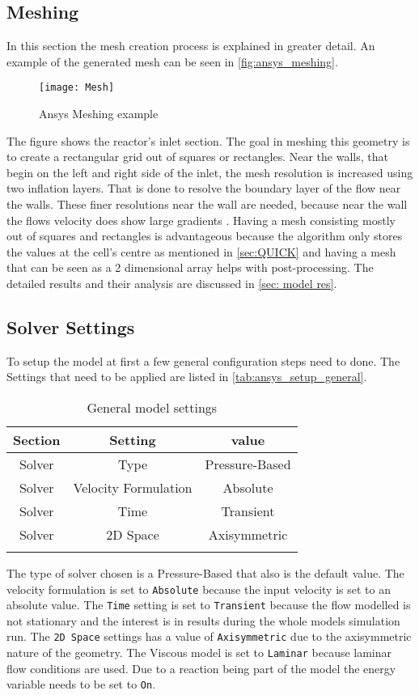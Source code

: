 \documentclass[../thesis.tex]{subfiles}
\begin{document}
\subsection{Meshing}
In this section the mesh creation process is explained in greater detail. An example of the generated mesh can be seen in \autoref{fig:ansys_meshing}.
\begin{figure}[htb]
	\centering
	\texttt{[image: Mesh]}
	\caption{Ansys Meshing example}
	\label{fig:ansys_meshing}
\end{figure}
The figure shows the reactor's inlet section. The goal in meshing this geometry is to create a rectangular grid out of squares or rectangles. Near the walls, that begin on the left and right side of the inlet, the mesh resolution is increased using two inflation layers. That is done to resolve the boundary layer of the flow near the walls. These finer resolutions near the wall are needed, because near the wall the flows velocity does show large gradients \cite{versteeg2007introduction}. Having a mesh consisting mostly out of squares and rectangles is advantageous because the algorithm only stores the values at the cell's centre as mentioned in \autoref{sec:QUICK} and having a mesh that can be seen as a 2 dimensional array helps with post-processing. The detailed results and their analysis are discussed in \autoref{sec: model res}.

\subsection{Solver Settings}
\label{sec: setup}

To setup the model at first a few general configuration steps need to done. The Settings that need to be applied are listed in \autoref{tab:ansys_setup_general}.

\begin{table} [htb]
	\centering
	\caption{General model settings}
	\begin{tabular}{ ccc }
		\hline
		Section & Setting & value \\
		\hline
		Solver & Type & Pressure-Based \\
		Solver & Velocity Formulation & Absolute  \\
		Solver & Time &  Transient  \\
		Solver & 2D Space & Axisymmetric \\
		\hline
		\label{tab:ansys_setup_general}
	\end{tabular}
\end{table}
The type of solver chosen is a Pressure-Based that also is the default value. The velocity formulation is set to \texttt{Absolute} because the input velocity is set to an absolute value. The \texttt{Time} setting is set to \texttt{Transient} because the flow modelled is not stationary and the interest is in results during the whole models simulation run. The \texttt{2D Space} settings has a value of \texttt{Axisymmetric} due to the axisymmetric nature of the geometry. The Viscous model is set to \texttt{Laminar} because laminar flow conditions are used. Due to a reaction being part of the model the energy variable needs to be set to \texttt{On}.
\end{document}
